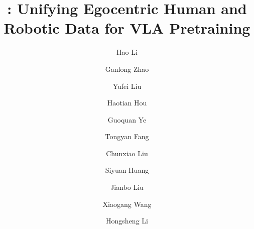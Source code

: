 \documentclass{llmxive}
\title{\Ours: Unifying Egocentric Human and Robotic Data for VLA Pretraining}
\author{Hao Li \and Ganlong Zhao \and Yufei Liu \and Haotian Hou \and Guoquan Ye \and Tongyan Fang \and Chunxiao Liu \and Siyuan Huang \and Jianbo Liu \and Xiaogang Wang \and Hongsheng Li}
\providecommand{\OURS}{\textsc{ACE-Ego-0}\xspace}
\providecommand{\Ours}{\OURS}
\begin{document}
\maketitle
\begin{abstract}
%
\end{abstract}

\end{document}

